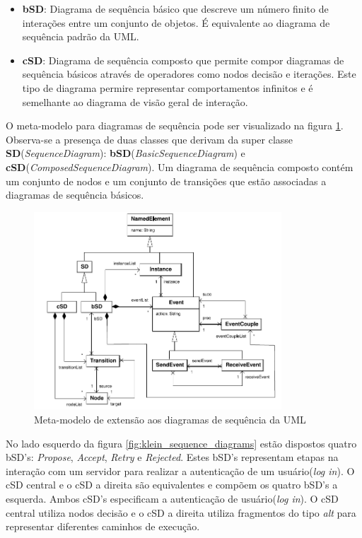 \begin{itemize}
  \item \textbf{bSD}: Diagrama de sequência básico que descreve um número finito de interações entre um conjunto de objetos. É equivalente ao diagrama
  de sequência padrão da UML.
  \item \textbf{cSD}: Diagrama de sequência composto que permite compor diagramas de sequência básicos através de operadores como nodos decisão
  e iterações. Este tipo de diagrama permire representar comportamentos infinitos e é semelhante ao diagrama de visão geral de interação.
\end{itemize}

O meta-modelo para diagramas de sequência pode ser visualizado na figura \ref{fig:klein_meta_model}. Observa-se a presença de duas classes que
derivam da super classe \textbf{SD}(\textit{SequenceDiagram}): \textbf{bSD}(\textit{BasicSequenceDiagram}) e
\textbf{cSD}(\textit{ComposedSequenceDiagram}). Um diagrama de sequência composto contém um conjunto de nodos e um conjunto de transições que estão
associadas a diagramas de sequência básicos.

\begin{figure}
	\centering
	\includegraphics[width=350px]{img/klein_meta_model.png}
	\caption{Meta-modelo de extensão aos diagramas de
	sequência da UML}\label{fig:klein_meta_model}
\end{figure}

No lado esquerdo da figura \ref{fig:klein_sequence_diagrams} estão dispostos quatro bSD's: \textit{Propose}, \textit{Accept}, \textit{Retry} e
\textit{Rejected}. Estes bSD's representam etapas na interação com um servidor para realizar a autenticação de um usuário(\textit{log in}). O cSD
central e o cSD a direita são equivalentes e compõem os quatro bSD's a esquerda. Ambos cSD's especificam a autenticação de usuário(\textit{log in}). O
cSD central utiliza nodos decisão e o cSD a direita utiliza fragmentos do tipo \textit{alt} para representar diferentes caminhos de execução.

